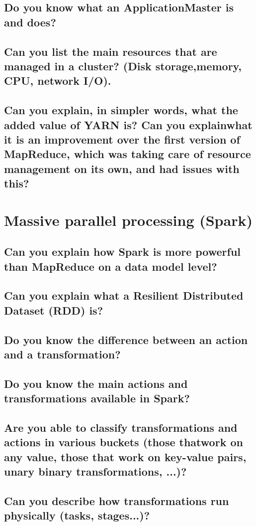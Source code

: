 \documentclass{article}
\begin{document}
\subsection{Do you know what an ApplicationMaster is and does?}
\subsection{Can you list the main resources that are managed in a cluster? (Disk storage,memory, CPU, network I/O).}
\subsection{Can you explain, in simpler words, what the added value of YARN is? Can you explainwhat it is an improvement over the first version of MapReduce, which was taking care of resource management on its own, and had issues with this?}

\pagebreak

\section{Massive parallel processing (Spark)}
\subsection{Can you explain how Spark is more powerful than MapReduce on a data model level?}
\subsection{Can you explain what a Resilient Distributed Dataset (RDD) is?}
\subsection{Do you know the difference between an action and a transformation?}
\subsection{Do you know the main actions and transformations available in Spark?}
\subsection{Are you able to classify transformations and actions in various buckets (those thatwork on any value, those that work on key-value pairs, unary binary transformations, ...)?}
\subsection{Can you describe how transformations run physically (tasks, stages...)?}
\end{document}

